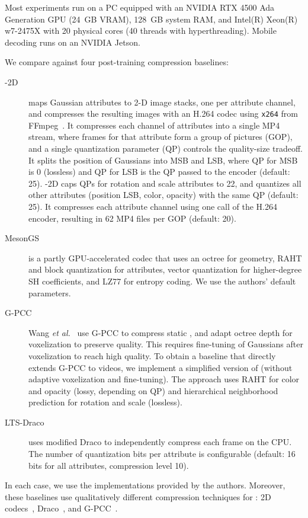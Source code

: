 %
Most experiments run on a PC equipped with an NVIDIA RTX 4500 Ada Generation GPU (24~GB VRAM), 128~GB system RAM, and Intel(R) Xeon(R) w7-2475X with 20 physical cores (40 threads with hyperthreading).
%
Mobile decoding runs on an NVIDIA Jetson.

%
We compare \gsnfs{} against four post-training compression baselines:
\begin{description}
  \item[\vthree{}-2D~\cite{v3volumetric}]
  maps Gaussian attributes to 2-D image stacks, one per attribute channel, and compresses the resulting images with an H.264 codec using \texttt{x264} from FFmpeg~\cite{ffmpeg}.
  It compresses each channel of attributes into a single MP4 stream, where frames for that attribute form a group of pictures (GOP), and a single quantization parameter (QP) controls the quality-size tradeoff.
  It splits the position of Gaussians into MSB and LSB, where QP for MSB is 0 (lossless) and QP for LSB is the QP passed to the encoder (default: 25).
  \vthree{}-2D caps QPs for rotation and scale attributes to 22, and quantizes all other attributes (position LSB, color, opacity) with the same QP (default: 25).
  It compresses each attribute channel using one call of the H.264 encoder, resulting in 62 MP4 files per GOP (default: 20).

  \item[MesonGS~\cite{mesongs}] is a partly GPU-accelerated codec that uses an octree for geometry, RAHT and block quantization for attributes, vector quantization for higher-degree SH coefficients, and LZ77 for entropy coding. 
  We use the authors' default parameters.

  \item[G-PCC~\cite{gpcc}] Wang \textit{et al.}~\cite{gpcc-adaptive} use G-PCC to compress static \gs, and adapt octree depth for voxelization to preserve quality.
  This requires fine-tuning of Gaussians after voxelization to reach high quality.
  To obtain a baseline that directly extends G-PCC to \dgs{} videos, we implement a simplified version of \cite{gpcc-adaptive} (without adaptive voxelization and fine-tuning).
  The approach uses RAHT for color and opacity (lossy, depending on QP) and hierarchical neighborhood prediction for rotation and scale (lossless).

  \item[LTS-Draco~\cite{LTS,mga}] 
  uses modified Draco to independently compress each \gs{} frame on the CPU. 
  The number of quantization bits per attribute is configurable (default: 16 bits for all attributes, compression level 10).
\end{description}
%
In each case, we use the implementations provided by the authors.
%
Moreover, these baselines use qualitatively different compression techniques for \dgs{}: 2D codecs~\cite{v3volumetric}, Draco~\cite{LTS}, and G-PCC~\cite{mesongs,gpcc-adaptive}.

